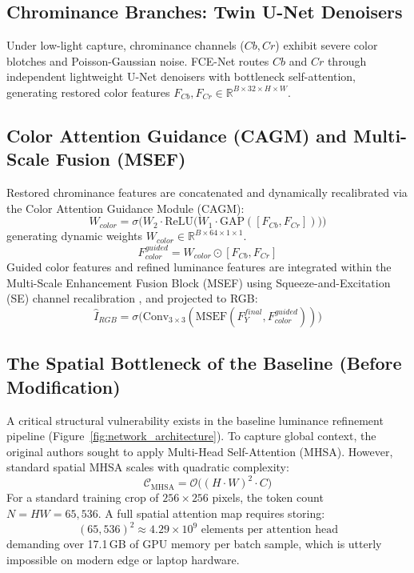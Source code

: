 \documentclass[10pt,twocolumn,letterpaper]{article}
\begin{document}
\subsection{Chrominance Branches: Twin U-Net Denoisers}
Under low-light capture, chrominance channels ($Cb, Cr$) exhibit severe color blotches and Poisson-Gaussian noise. FCE-Net routes $Cb$ and $Cr$ through independent lightweight U-Net denoisers with bottleneck self-attention, generating restored color features $F_{Cb}, F_{Cr} \in \mathbb{R}^{B \times 32 \times H \times W}$.

\subsection{Color Attention Guidance (CAGM) and Multi-Scale Fusion (MSEF)}
Restored chrominance features are concatenated and dynamically recalibrated via the Color Attention Guidance Module (CAGM):
\begin{equation}
W_{color} = \sigma\Big( W_2 \cdot \text{ReLU}\big( W_1 \cdot \text{GAP}([F_{Cb}, F_{Cr}]) \big) \Big)
\end{equation}
generating dynamic weights $W_{color} \in \mathbb{R}^{B \times 64 \times 1 \times 1}$.
\begin{equation}
F_{color}^{guided} = W_{color} \odot [F_{Cb}, F_{Cr}]
\end{equation}
Guided color features and refined luminance features are integrated within the Multi-Scale Enhancement Fusion Block (MSEF) using Squeeze-and-Excitation (SE) channel recalibration \cite{hu2018squeeze}, and projected to RGB:
\begin{equation}
\hat{I}_{RGB} = \sigma\big( \text{Conv}_{3\times3}(\text{MSEF}(F_Y^{final}, F_{color}^{guided})) \big)
\end{equation}

\subsection{The Spatial Bottleneck of the Baseline (Before Modification)}
\label{sec:bottleneck_before}
A critical structural vulnerability exists in the baseline luminance refinement pipeline (Figure~\ref{fig:network_architecture}). To capture global context, the original authors sought to apply Multi-Head Self-Attention (MHSA). However, standard spatial MHSA scales with quadratic complexity:
\begin{equation}
\mathcal{C}_{\text{MHSA}} = \mathcal{O}\big( (H \cdot W)^2 \cdot C \big)
\end{equation}
For a standard training crop of $256 \times 256$ pixels, the token count $N = HW = 65,536$. A full spatial attention map requires storing:
\begin{equation}
(65,536)^2 \approx 4.29 \times 10^9 \text{ elements per attention head}
\end{equation}
demanding over 17.1\,GB of GPU memory per batch sample, which is utterly impossible on modern edge or laptop hardware.
\end{document}
